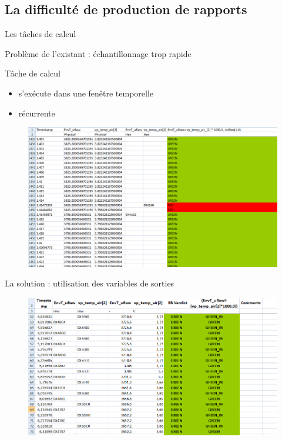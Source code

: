 \documentclass{beamer}
\begin{document}
	\subsection{La difficulté de production de rapports}
	\begin{frame}{Les tâches de calcul}

	\end{frame}
	\begin{frame}{\normalsize Problème de l'existant : échantillonnage trop rapide}
\begin{block}{Tâche de calcul}
			\begin{itemize}
				\item s'exécute dans une fenêtre temporelle
				\item récurrente
			\end{itemize}
		\end{block}
\begin{figure}
\centering
\includegraphics[width=1\linewidth]{images/badReport}
\caption{}
\label{fig:badReport}
\end{figure}
	\end{frame}

	\begin{frame}{\normalsize La solution : utilisation des variables de sorties}		
\begin{figure}
\centering
\includegraphics[width=0.9\linewidth]{../rapport/contents/images/goodReport}
\caption{}
\label{fig:goodReport}
\end{figure}

	\end{frame}
\end{document}

